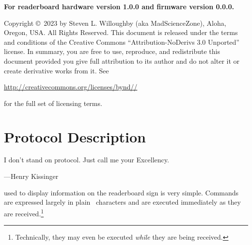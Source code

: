 \begin{center}\bfseries
	For readerboard hardware version 1.0.0 and firmware version 0.0.0.
\end{center}

\strut\vfill

\noindent Copyright \copyright\ 2023 by Steven L. Willoughby
(aka MadScienceZone), Aloha, Oregon, USA. All Rights Reserved.
This document is released under the terms and conditions of the
Creative Commons ``Attribution-NoDerivs 3.0 Unported'' license.
In summary, you are free to use, reproduce, and redistribute this 
document provided you give full attribution to its author and do not
alter it or create derivative works from it.  See
\begin{center}
\href{http://creativecommons.org/licenses/by-nd-3.0}{http://creativecommons.org/licenses/by\-nd\-//} 
\end{center}
for the full set of licensing terms.

\begin{center}
\end{center}

\newpage
\tableofcontents
\newpage
\listoffigures
\listoftables
\mainmatter

%
\chapter{Protocol Description}\label{chap:protocol}
{\setlength{\epigraphwidth}{.5\textwidth}
\epigraph{I don't stand on protocol. Just call me your Excellency.}{---Henry Kissinger}}
 used to display information on the readerboard sign is very simple.
Commands are expressed largely in plain \ascii\ characters and are executed immediately
as they are received.\footnote{Technically, they may even be executed \emph{while} they
are being received.}

